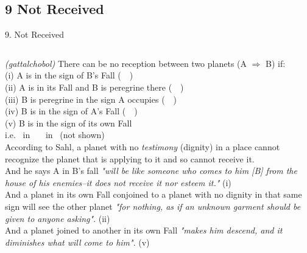 \subsection{9 Not Received}
\begin{frame}[t]{9. Not Received}
\footnotesize
\begin{columns}[T, onlytextwidth]
\textsl{(gattalchobol)} There can be no reception between two planets (A $\Rightarrow$ B) if: \\
\vspace{0.25cm}
(i) A is in the sign of B's Fall (\Moon\ \Square\ \Saturn) \\
(ii) A is in its Fall and B is peregrine there (\Venus\ \Sextile\ \Jupiter) \\
(iii) B is peregrine in the sign A occupies (\Jupiter\ \Trine\ \Saturn)\\
(iv) B is in the sign of A's Fall (\Mercury\ \Square\ \Mars) \\
(v) B is in the sign of its own Fall \\
\hspace{1em}i.e. \Moon\ in \Gemini\ \Trine\ \Sun\ in \Libra\ (not shown) \\
\vspace{0.25cm}
According to Sahl, a planet with no \textsl{testimony} (dignity) in a place cannot recognize the planet that is applying to it and so cannot receive it. \\

And he says A in B's fall \textsl{"will be like someone who comes to him [B] from the house of his enemies--it does not receive it nor esteem it."} (i) \\

And a planet in its own Fall conjoined to a planet with no dignity in that same sign will see the other planet \textsl{"for nothing, as if an unknown garment should be given to anyone asking"}. (ii)\\

And a planet joined to another in its own Fall \textsl{"makes him descend, and it diminishes what will come to him"}. (v)


\end{columns}
\end{frame}
